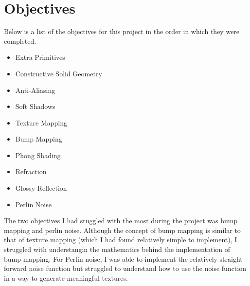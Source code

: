 \section{Objectives}
Below is a list of the objectives for this project in the order in which they
were completed. 

\begin{itemize}
  \item Extra Primitives
  \item Constructive Solid Geometry
  \item Anti-Aliasing
  \item Soft Shadows
  \item Texture Mapping
  \item Bump Mapping
  \item Phong Shading
  \item Refraction
  \item Glossy Reflection
  \item Perlin Noise
\end{itemize}

The two objectives I had stuggled with the most during the
project was bump mapping and perlin noise. Although the concept of bump mapping
is similar to that of texture mapping (which I had found relatively simple to
implement), I struggled with understangin the mathematics behind the
implementation of bump mapping. For Perlin noise, I was able to implement the
relatively straight-forward noise function but struggled to understand how to
use the noise function in a way to generate meaningful textures.
